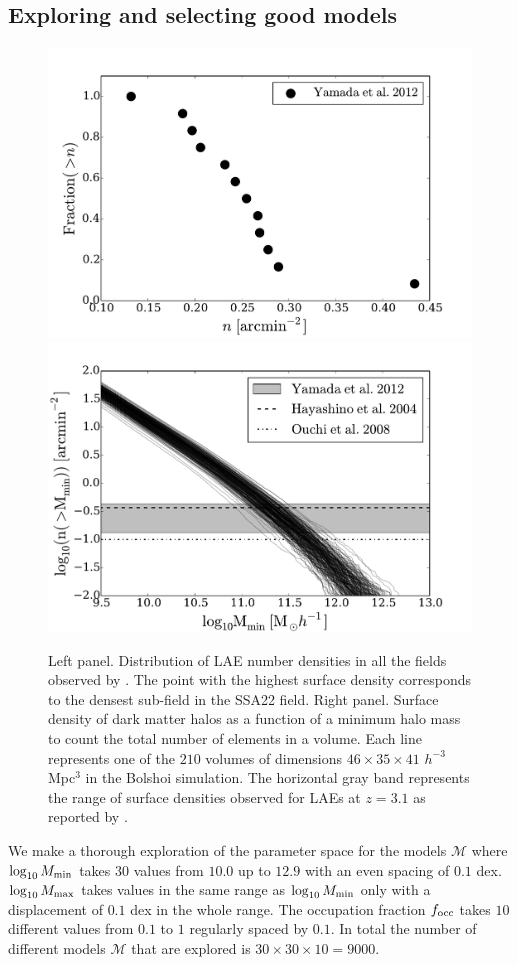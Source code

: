 \documentclass[usenatbib]{mn2e}
\begin{document}
{\subsection{Exploring and selecting good models}


\begin{figure}
\begin{center}
\includegraphics[width=0.45\linewidth,angle=0]{Fig1b.pdf}
\includegraphics[width=0.45\linewidth,angle=0]{Fig1.pdf}
\caption{ \label{fig:halos} Left panel. Distribution of LAE number
  densities in all the fields observed by \citet{Yamada2012}. The
  point with the highest surface density corresponds to the densest
  sub-field in the SSA22 field. Right panel. Surface density of dark 
  matter halos as a function of a minimum halo mass to count the
  total number of elements in a volume. Each line represents one of the
  $210$ volumes of dimensions $46\times 35\times 41$ $h^{-3}$ Mpc$^{3}$
  in the Bolshoi simulation. The horizontal gray band represents the
  range of surface densities observed for LAEs at $z=3.1$ as reported
  by \citep{Yamada2012}.}
\end{center} 
\end{figure}


We make a thorough exploration of the parameter space for the models
${\mathcal M}$ where $\log_{10} M_{\rm min}$ takes $30$ values from $10.0$ up
to $12.9$ with an even spacing of $0.1$ dex. $\log_{10} M_{\rm max}$
takes values in the same range as $\log_{10}M_{\rm min}$ only with a
displacement of $0.1$ dex in the whole range. The occupation fraction
$f_{\rm occ}$ takes $10$ different values from $0.1$ to $1$ regularly
spaced by $0.1$. In total the number of different models ${\mathcal
  M}$ that are explored is $30 \times 30 \times 10 = 9000$. 


}
\end{document}
